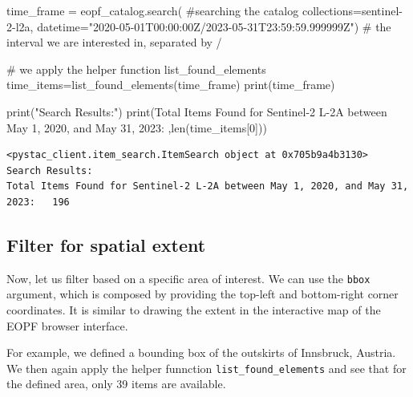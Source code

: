 \documentclass[
  letterpaper,
  DIV=11,
  numbers=noendperiod]{scrreprt}
\newenvironment{Shaded}{\begin{snugshade}}{\end{snugshade}}
\newcommand{\BuiltInTok}[1]{\textcolor[rgb]{0.00,0.23,0.31}{#1}}
\newcommand{\CommentTok}[1]{\textcolor[rgb]{0.37,0.37,0.37}{#1}}
\newcommand{\DecValTok}[1]{\textcolor[rgb]{0.68,0.00,0.00}{#1}}
\newcommand{\NormalTok}[1]{\textcolor[rgb]{0.00,0.23,0.31}{#1}}
\newcommand{\OperatorTok}[1]{\textcolor[rgb]{0.37,0.37,0.37}{#1}}
\newcommand{\StringTok}[1]{\textcolor[rgb]{0.13,0.47,0.30}{#1}}
\begin{document}
\begin{Shaded}
\begin{Highlighting}[]
\NormalTok{time\_frame }\OperatorTok{=}\NormalTok{ eopf\_catalog.search(  }\CommentTok{\#searching the catalog}
\NormalTok{    collections}\OperatorTok{=}\StringTok{\textquotesingle{}sentinel{-}2{-}l2a\textquotesingle{}}\NormalTok{,}
\NormalTok{    datetime}\OperatorTok{=}\StringTok{"2020{-}05{-}01T00:00:00Z/2023{-}05{-}31T23:59:59.999999Z"}\NormalTok{)  }\CommentTok{\# the interval we are interested in, separated by \textquotesingle{}/\textquotesingle{}}

\CommentTok{\# we apply the helper function \textasciigrave{}list\_found\_elements\textasciigrave{}}
\NormalTok{time\_items}\OperatorTok{=}\NormalTok{list\_found\_elements(time\_frame)}
\BuiltInTok{print}\NormalTok{(time\_frame)}

\BuiltInTok{print}\NormalTok{(}\StringTok{"Search Results:"}\NormalTok{)}
\BuiltInTok{print}\NormalTok{(}\StringTok{\textquotesingle{}Total Items Found for Sentinel{-}2 L{-}2A between May 1, 2020, and May 31, 2023:  \textquotesingle{}}\NormalTok{,}\BuiltInTok{len}\NormalTok{(time\_items[}\DecValTok{0}\NormalTok{]))}
\end{Highlighting}
\end{Shaded}

\begin{verbatim}
<pystac_client.item_search.ItemSearch object at 0x705b9a4b3130>
Search Results:
Total Items Found for Sentinel-2 L-2A between May 1, 2020, and May 31, 2023:   196
\end{verbatim}

\subsection{Filter for spatial extent}\label{filter-for-spatial-extent}

Now, let us filter based on a specific area of interest. We can use the
\texttt{bbox} argument, which is composed by providing the top-left and
bottom-right corner coordinates. It is similar to drawing the extent in
the interactive map of the EOPF browser interface.

For example, we defined a bounding box of the outskirts of Innsbruck,
Austria. We then again apply the helper funnction
\texttt{list\_found\_elements} and see that for the defined area, only
39 items are available.
\end{document}
